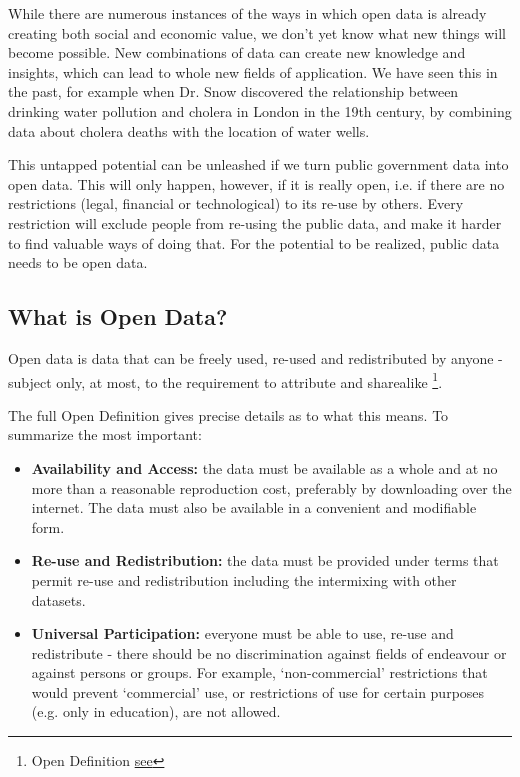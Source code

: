 \documentclass[letterpaper,12pt,oneside]{sphinxmanual}
\begin{document}
While there are numerous instances of the ways in which open data is already creating both social and economic value, we don’t yet know what new things will become possible. New combinations of data can create new knowledge and insights, which can lead to whole new fields of application. We have seen this in the past, for example when Dr. Snow discovered the relationship between drinking water pollution and cholera in London in the 19th century, by combining data about cholera deaths with the location of water wells.

This untapped potential can be unleashed if we turn public government data into open data. This will only happen, however, if it is really open, i.e. if there are no restrictions (legal, financial or technological) to its re-use by others. Every restriction will exclude people from re-using the public data, and make it harder to find valuable ways of doing that. For the potential to be realized, public data needs to be open data.


\subsection{What is Open Data?}
\label{introduction:what-is-open-data}
Open data is data that can be freely used, re-used and redistributed by anyone - subject only, at most, to the requirement to attribute and sharealike \footnote[3]{\sphinxAtStartFootnote%
Open Definition \href{http://opendefinition.org}{see}
}.

The full Open Definition gives precise details as to what this means. To summarize the most important:
\begin{itemize}
\item {} 
\textbf{Availability and Access:} the data must be available as a whole and at no more than a reasonable reproduction cost, preferably by downloading over the internet. The data must also be available in a convenient and modifiable form.

\item {} 
\textbf{Re-use and Redistribution:} the data must be provided under terms that permit re-use and redistribution including the intermixing with other datasets.

\item {} 
\textbf{Universal Participation:} everyone must be able to use, re-use and redistribute - there should be no discrimination against fields of endeavour or against persons or groups. For example, ‘non-commercial’ restrictions that would prevent ‘commercial’ use, or restrictions of use for certain purposes (e.g. only in education), are not allowed.

\end{itemize}
\end{document}
